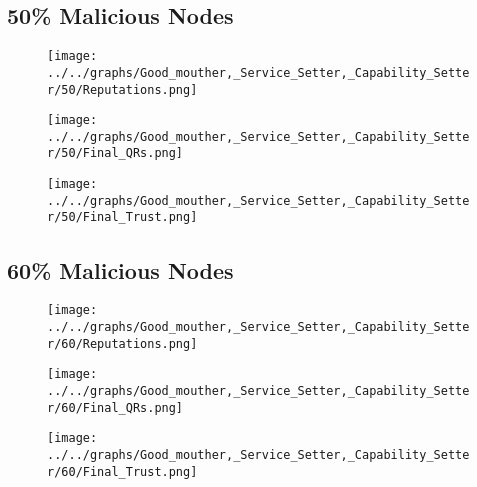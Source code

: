 \begin{minipage}[t]{0.49\columnwidth}
\subsection*{50\% Malicious Nodes}
    \begin{figure}[H]
        \centering
        \texttt{[image: ../../graphs/Good\_mouther,\_Service\_Setter,\_Capability\_Setter/50/Reputations.png]}
    \end{figure}
    \begin{figure}[H]
        \centering
        \texttt{[image: ../../graphs/Good\_mouther,\_Service\_Setter,\_Capability\_Setter/50/Final\_QRs.png]}
    \end{figure}
\end{minipage}
\begin{minipage}[t]{0.49\columnwidth}
    \begin{figure}[H]
        \centering
        \texttt{[image: ../../graphs/Good\_mouther,\_Service\_Setter,\_Capability\_Setter/50/Final\_Trust.png]}
    \end{figure}
\end{minipage}

\begin{minipage}[t]{0.49\columnwidth}
\subsection*{60\% Malicious Nodes}
    \begin{figure}[H]
        \centering
        \texttt{[image: ../../graphs/Good\_mouther,\_Service\_Setter,\_Capability\_Setter/60/Reputations.png]}
    \end{figure}
    \begin{figure}[H]
        \centering
        \texttt{[image: ../../graphs/Good\_mouther,\_Service\_Setter,\_Capability\_Setter/60/Final\_QRs.png]}
    \end{figure}
\end{minipage}
\begin{minipage}[t]{0.49\columnwidth}
    \begin{figure}[H]
        \centering
        \texttt{[image: ../../graphs/Good\_mouther,\_Service\_Setter,\_Capability\_Setter/60/Final\_Trust.png]}
    \end{figure}
\end{minipage}

